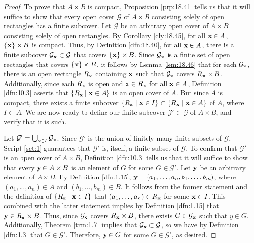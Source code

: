 \documentclass[../main.tex]{subfiles}
\begin{document}
\begin{theorem}
\begin{proof}

        To prove that $A\times B$ is compact, Proposition \ref{prp:18.41} tells us that it will suffice to show that every open cover $\mathcal{G}$ of $A\times B$ consisting solely of open rectangles has a finite subcover. Let $\mathcal{G}$ be an arbitrary open cover of $A\times B$ consisting solely of open rectangles. By Corollary \ref{cly:18.45}, for all $\mathbf{x}\in A$, $\{\mathbf{x}\}\times B$ is compact. Thus, by Definition \ref{dfn:18.40}, for all $\mathbf{x}\in A$, there is a finite subcover $\mathcal{G}_{\mathbf{x}}\subset\mathcal{G}$ that covers $\{\mathbf{x}\}\times B$. Since $\mathcal{G}_{\mathbf{x}}$ is a finite set of open rectangles that covers $\{\mathbf{x}\}\times B$, it follows by Lemma \ref{lem:18.46} that for each $\mathcal{G}_{\mathbf{x}}$, there is an open rectangle $R_{\mathbf{x}}$ containing $\mathbf{x}$ such that $\mathcal{G}_{\mathbf{x}}$ covers $R_{\mathbf{x}}\times B$. Additionally, since each $R_{\mathbf{x}}$ is open and $\mathbf{x}\in R_{\mathbf{x}}$ for all $\mathbf{x}\in A$, Definition \ref{dfn:10.3} asserts that $\{R_{\mathbf{x}}\mid\mathbf{x}\in A\}$ is an open cover of $A$. But since $A$ is compact, there exists a finite subcover $\{R_{\mathbf{x}}\mid\mathbf{x}\in I\}\subset\{R_{\mathbf{x}}\mid\mathbf{x}\in A\}$ of $A$, where $I\subset A$. We are now ready to define our finite subcover $\mathcal{G}'\subset\mathcal{G}$ of $A\times B$, and verify that it is such.\par
        Let $\mathcal{G}'=\bigcup_{\mathbf{x}\in I}\mathcal{G}_{\mathbf{x}}$. Since $\mathcal{G}'$ is the union of finitely many finite subsets of $\mathcal{G}$, Script \ref{sct:1} guarantees that $\mathcal{G}'$ is, itself, a finite subset of $\mathcal{G}$. To confirm that $\mathcal{G}'$ is an open cover of $A\times B$, Definition \ref{dfn:10.3} tells us that it will suffice to show that every $\mathbf{y}\in A\times B$ is an element of $G$ for some $G\in\mathcal{G}'$. Let $\mathbf{y}$ be an arbitrary element of $A\times B$. By Definition \ref{dfn:1.15}, $\mathbf{y}=(a_1,\dots,a_n,b_1,\dots,b_m)$, where $(a_1,\dots,a_n)\in A$ and $(b_1,\dots,b_m)\in B$. It follows from the former statement and the definition of $\{R_{\mathbf{x}}\mid\mathbf{x}\in I\}$ that $(a_1,\dots,a_n)\in R_{\mathbf{x}}$ for some $\mathbf{x}\in I$. This combined with the latter statement implies by Definition \ref{dfn:1.15} that $\mathbf{y}\in R_{\mathbf{x}}\times B$. Thus, since $\mathcal{G}_{\mathbf{x}}$ covers $R_{\mathbf{x}}\times B$, there exists $G\in\mathcal{G}_{\mathbf{x}}$ such that $y\in G$. Additionally, Theorem \ref{trm:1.7} implies that $\mathcal{G}_{\mathbf{x}}\subset\mathcal{G}$, so we have by Definition \ref{dfn:1.3} that $G\in\mathcal{G}'$. Therefore, $\mathbf{y}\in G$ for some $G\in\mathcal{G}'$, as desired.
    \end{proof}
\end{theorem}
\end{document}
